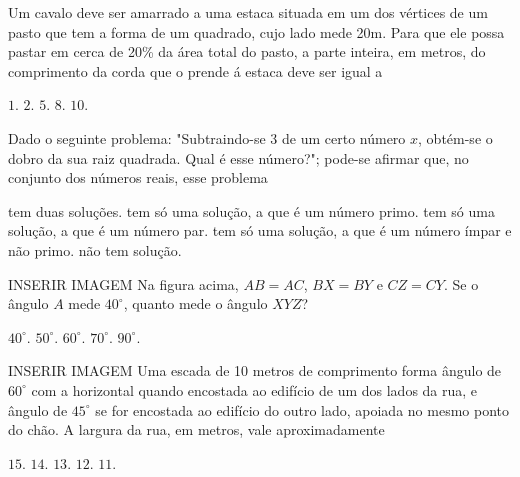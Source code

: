 \begin{question}%
Um cavalo deve ser amarrado a uma estaca situada em um dos vértices de um pasto que tem a forma de um quadrado, cujo lado mede 20m. Para que ele possa pastar em cerca de 20\% da área total do pasto, a parte inteira, em metros, do comprimento da corda que o prende á estaca deve ser igual a
    \begin{tasks}
        \task \(1\).
        \task \(2\).
        \task \(5\).
        \task \(8\).
        \task \(10\).
    \end{tasks}
\end{question}

\begin{question}%
Dado o seguinte problema: "Subtraindo-se \(3\) de um certo número \(x\), obtém-se o dobro da sua raiz quadrada. Qual é esse número?"; pode-se afirmar que, no conjunto dos números reais, esse problema
    \begin{tasks}
        \task tem duas soluções.
        \task tem só uma solução, a que é um número primo.
        \task tem só uma solução, a que é um número par.
        \task tem só uma solução, a que é um número ímpar e não primo.
        \task não tem solução.
    \end{tasks}
\end{question}

\begin{question}%
INSERIR IMAGEM
Na figura acima, \(AB = AC\), \(BX = BY\) e \(CZ = CY\). Se o ângulo \(A\) mede \(40^\circ\), quanto mede o ângulo \(XYZ\)?
    \begin{tasks}
        \task \(40^\circ\).
        \task \(50^\circ\).
        \task \(60^\circ\).
        \task \(70^\circ\).
        \task \(90^\circ\).
    \end{tasks}
\end{question}

\begin{question}%
INSERIR IMAGEM
Uma escada de 10 metros de comprimento forma ângulo de \(60^\circ\) com a horizontal quando encostada ao edifício de um dos lados da rua, e ângulo de \(45^\circ\) se for encostada ao edifício do outro lado, apoiada no mesmo ponto do chão. A largura da rua, em metros, vale aproximadamente
    \begin{tasks}
        \task \(15\).
        \task \(14\).
        \task \(13\).
        \task \(12\).
        \task \(11\).
    \end{tasks}
\end{question}

